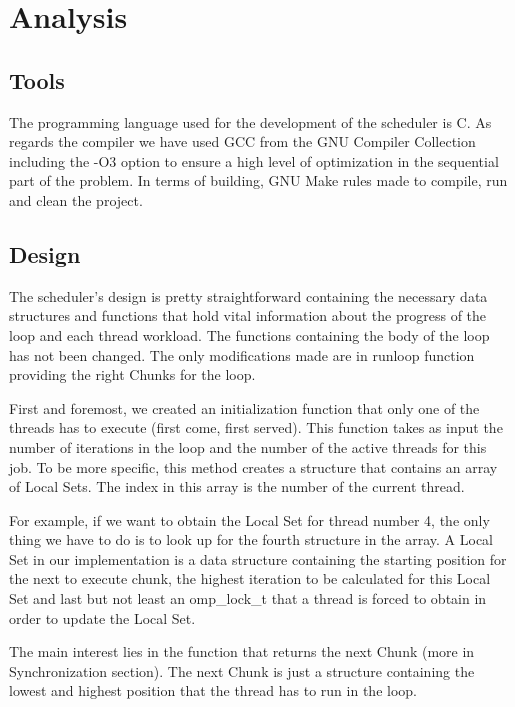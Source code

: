 \documentclass[12pt,a4paper]{article}
\newcommand{\sectionVspacing}{\vspace{15pt}}
\begin{document}
\sectionVspacing

\section{Analysis}

\subsection{Tools}

The programming language used for the development of the scheduler is C. As regards the compiler we have used GCC from the GNU Compiler Collection including the -O3 option to ensure a high level of optimization in the sequential part of the problem. In terms of building, GNU Make rules made to compile, run and clean the project.

\subsection{Design}

The scheduler's design is pretty straightforward containing the necessary data structures and functions that hold vital information about the progress of the loop and each thread workload. The functions containing the body of the loop has not been changed. The only modifications made are in runloop function providing the right Chunks for the loop.

First and foremost, we created an initialization function that only one of the threads has to execute (first come, first served). This function takes as input the number of iterations in the loop and the number of the active threads for this job. To be more specific, this method creates a structure that contains an array of Local Sets. The index in this array is the number of the current thread. 

For example, if we want to obtain the Local Set for thread number 4, the only thing we have to do is to look up for the fourth structure in the array.
A Local Set in our implementation is a data structure containing the starting position for the next to execute chunk, the highest iteration to be calculated for this Local Set and last but not least an omp\_lock\_t that a thread is forced to obtain in order to update the Local Set.

The main interest lies in the function that returns the next Chunk (more in Synchronization section). The next Chunk is just a structure containing the lowest and highest position that the thread has to run in the loop.
\end{document}
